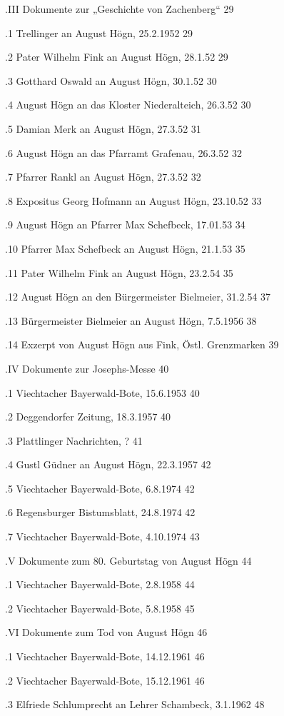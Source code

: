 \documentclass[12pt,a4pager]{book}
\begin{document}
.III Dokumente zur „Geschichte von Zachenberg“  29

.1 Trellinger an August Högn, 25.2.1952 29

.2 Pater Wilhelm Fink an August Högn, 28.1.52   29

.3 Gotthard Oswald an August Högn, 30.1.52  30

.4 August Högn an das Kloster Niederalteich, 26.3.52    30

.5 Damian Merk an August Högn, 27.3.52  31

.6 August Högn an das Pfarramt Grafenau, 26.3.52    32

.7 Pfarrer Rankl an August Högn, 27.3.52    32

.8 Expositus Georg Hofmann an August Högn, 23.10.52 33

.9 August Högn an Pfarrer Max Schefbeck, 17.01.53   34

.10 Pfarrer Max Schefbeck an August Högn, 21.1.53   35

.11 Pater Wilhelm Fink an August Högn, 23.2.54  35

.12 August Högn an den Bürgermeister Bielmeier, 31.2.54 37

.13 Bürgermeister Bielmeier an August Högn, 7.5.1956    38

.14 Exzerpt von August Högn aus Fink, Östl. Grenzmarken 39

.IV Dokumente zur Josephs-Messe 40

.1 Viechtacher Bayerwald-Bote, 15.6.1953    40

.2 Deggendorfer Zeitung, 18.3.1957  40

.3 Plattlinger Nachrichten, ?   41

.4 Gustl Güdner an August Högn, 22.3.1957   42

.5 Viechtacher Bayerwald-Bote, 6.8.1974 42

.6 Regensburger Bistumsblatt, 24.8.1974 42

.7 Viechtacher Bayerwald-Bote, 4.10.1974    43

.V Dokumente zum 80. Geburtstag von August Högn 44

.1 Viechtacher Bayerwald-Bote, 2.8.1958     44

.2 Viechtacher Bayerwald-Bote, 5.8.1958 45

.VI Dokumente zum Tod von August Högn   46

.1 Viechtacher Bayerwald-Bote, 14.12.1961   46

.2 Viechtacher Bayerwald-Bote, 15.12.1961   46

.3 Elfriede Schlumprecht an Lehrer Schambeck, 3.1.1962  48
\end{document}
